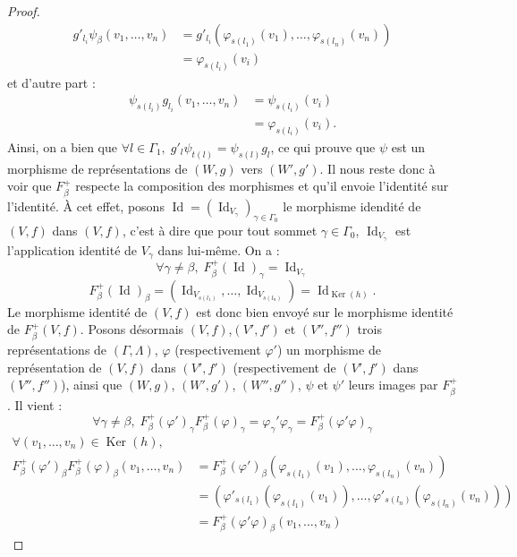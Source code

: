 \documentclass[a4paper,10pt]{article}
\DeclareMathOperator{\Ker}{Ker}
\DeclareMathOperator{\Id}{Id}
\begin{document}
\begin{proof}
\[
\begin{array}{ll}
	g'_{l_{i}}\psi_{\beta}(v_{1},\dots,v_{n})&=g'_{l_{i}}(\varphi_{s(l_{1})}(v_{1}),\dots,\varphi_{s(l_{n})}(v_{n}))\\
	&=\varphi_{s(l_{i})}(v_{i})
\end{array}
\]
et d'autre part :
\[
\begin{array}{ll}
	\psi_{s(l_{i})}g_{l_{i}}(v_{1},\dots,v_{n})&=\psi_{s(l_{i})}(v_{i})\\
	&=\varphi_{s(l_{i})}(v_{i}).
\end{array}
\]
Ainsi, on a bien que $\forall l \in\Gamma_{1},\;g'_{l}\psi_{t(l)}=\psi_{s(l)}g_{l}$, ce qui prouve que $\psi$ est un morphisme de représentations de $(W,g)$ vers $(W',g')$. Il nous reste donc à voir que $F_{\beta}^{+}$ respecte la composition des morphismes et qu'il envoie l'identité sur l'identité. À cet effet, posons $\Id = (\Id_{V_{\gamma}})_{\gamma\in\Gamma_{0}}$ le morphisme idendité de $(V,f)$ dans $(V,f)$, c'est à dire que pour tout sommet $\gamma\in\Gamma_{0}$, $\Id_{V_{\gamma}}$ est l'application identité de $V_{\gamma}$ dans lui-même. On a :
\[
	\forall \gamma\neq\beta,\;F_{\beta}^{+}(\Id)_{\gamma}=\Id_{V_{\gamma}}
\]
\[
	F_{\beta}^{+}(\Id)_{\beta}=(\Id_{V_{s(l_{1})}},\dots,\Id_{V_{s(l_{n})}})=\Id_{\Ker(h)}.
\]
Le morphisme identité de $(V,f)$ est donc bien envoyé sur le morphisme identité de $F_{\beta}^{+}(V,f)$. Posons désormais $(V,f)$,$(V',f')$ et $(V'',f'')$ trois représentations de $(\Gamma,\Lambda)$, $\varphi$ (respectivement $\varphi '$) un morphisme de représentation de $(V,f)$ dans $(V',f')$ (respectivement de $(V',f')$ dans $(V'',f'')$), ainsi que $(W,g)$, $(W',g')$, $(W'',g'')$, 
 $\psi$ et $\psi '$ leurs images par $F_{\beta}^{+}$. Il vient :
\[
	\forall \gamma\neq\beta,\;F_{\beta}^{+}(\varphi')_{\gamma}F_{\beta}^{+}(\varphi)_{\gamma}=\varphi_{\gamma}'\varphi_{\gamma}=F_{\beta}^{+}(\varphi'\varphi)_{\gamma}
\]
\[
	\begin{array}{ll}
		\forall (v_{1},\dots,v_{n})\in\Ker(h),& \\
		F_{\beta}^{+}(\varphi')_{\beta}F_{\beta}^{+}(\varphi)_{\beta}(v_{1},\dots,v_{n})&=F_{\beta}^{+}(\varphi')_{\beta}(\varphi_{s(l_{1})}(v_{1}),\dots,\varphi_{s(l_{n})}(v_{n}))\\
		&=(\varphi'_{s(l_{1})}(\varphi_{s(l_{1})}(v_{1})),\dots,\varphi'_{s(l_{n})}(\varphi_{s(l_{n})}(v_{n})))\\
		&=F_{\beta}^{+}(\varphi'\varphi)_{\beta}(v_{1},\dots,v_{n})


\end{array}\]
\end{proof}
\end{document}
